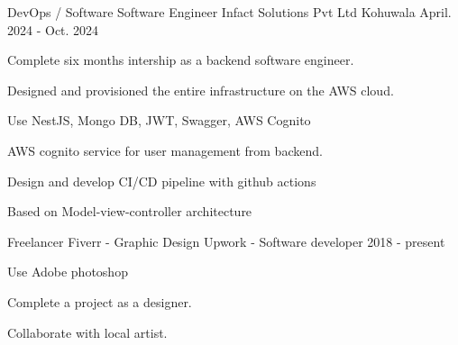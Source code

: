 

\begin{cventries}

  \cventry
    {DevOps / Software Software Engineer} %
    {Infact Solutions Pvt Ltd} %
    {Kohuwala} %
    {April. 2024 - Oct. 2024} %

    {
      \begin{cvitems} %
        \item {Complete six months intership as a backend software engineer.}
        \item {Designed and provisioned the entire infrastructure on the AWS cloud.}
        \item {Use NestJS, Mongo DB, JWT, Swagger, AWS Cognito}
        \item {AWS cognito service for user management from backend.}
        \item {Design and develop CI/CD pipeline with github actions}
        \item {Based on Model-view-controller architecture}
      \end{cvitems}
    }


    {Freelancer} %
    {Fiverr - Graphic Design}
    {Upwork - Software developer}
    {2018 - present} %
    {
      \begin{cvitems} %
        \item {Use Adobe photoshop}
        \item {Complete a project as a designer.}
        \item {Collaborate with local artist.}
      \end{cvitems}
    }

\end{cventries}
